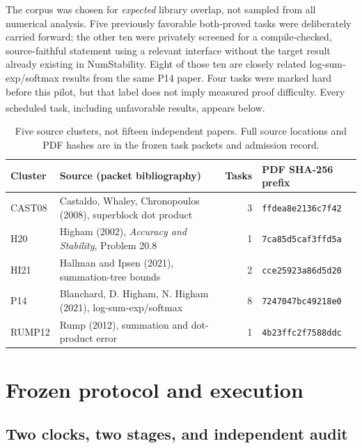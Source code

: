 \documentclass[10pt,a4paper]{article}
\newcommand{\src}[1]{\textsuperscript{\cite{#1}}}
\begin{document}
The corpus was chosen for \emph{expected} library overlap, not sampled from
all numerical analysis. Five previously favorable both-proved tasks were
deliberately carried forward; the other ten were privately screened for a
compile-checked, source-faithful statement using a relevant interface without
the target result already existing in NumStability. Eight of those ten are
closely related log-sum-exp/softmax results from the same P14 paper. Four tasks
were marked hard before this pilot, but that label does not imply measured
proof difficulty. Every scheduled task, including unfavorable results, appears
below.\src{screen33,admission33,corpus33,results35}

\begin{table}[ht]\centering\small
\begin{tabular}{@{}llrl@{}}\toprule
Cluster & Source (packet bibliography) & Tasks & PDF SHA-256 prefix\\\midrule
CAST08 & Castaldo, Whaley, Chronopoulos (2008), superblock dot product & 3 & \texttt{ffdea8e2136c7f42}\\
H20 & Higham (2002), \emph{Accuracy and Stability}, Problem 20.8 & 1 & \texttt{7ca85d5caf3ffd5a}\\
HI21 & Hallman and Ipsen (2021), summation-tree bounds & 2 & \texttt{cce25923a86d5d20}\\
P14 & Blanchard, D. Higham, N. Higham (2021), log-sum-exp/softmax & 8 & \texttt{7247047bc49218e0}\\
RUMP12 & Rump (2012), summation and dot-product error & 1 & \texttt{4b23ffc2f7588ddc}\\
\bottomrule\end{tabular}
\caption{Five source clusters, not fifteen independent papers. Full source locations and PDF hashes are in the frozen task packets and admission record.\cite{packets33,admission33,corpus33,castpaper,highampaper,hipaper,p14paper,rumppaper}}
\label{tab:papers}
\end{table}

\section{Frozen protocol and execution}

\subsection{Two clocks, two stages, and independent audit}
\end{document}
